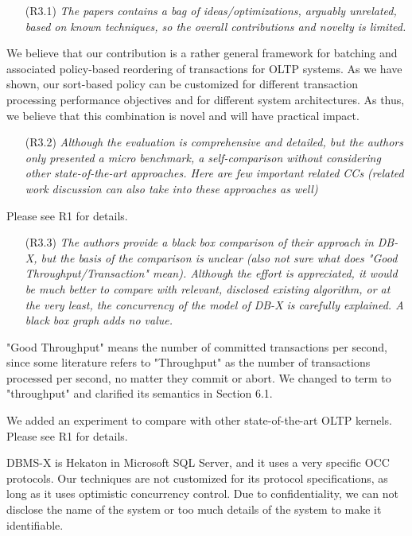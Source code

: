 \documentclass{article}
\newcommand{\todo}[1]{}
\newcommand{\changed}[1]{#1}
\newcommand{\todo}[1]{\textcolor{red}{\bf [TODO!: #1]}}
\newcommand{\changed}[1]{{\color{blue}#1}}
\begin{document}
\begin{itemize}
\item[(R3.1)] \emph{The papers contains a bag of ideas/optimizations, arguably unrelated,
	based on known techniques, so the overall contributions and novelty is
	limited.}
\end{itemize}

\todo{Better wording needed}
\changed{
	We believe that our contribution is a rather general framework for batching and associated policy-based reordering of transactions for OLTP systems. As we have shown, our sort-based policy can be customized for different transaction processing performance objectives and for different system architectures. As thus, we believe that this combination is novel and will have practical impact.
}

\begin{itemize}
\item[(R3.2)] \emph{Although the evaluation is comprehensive and detailed, but the authors
	only presented a micro benchmark, a self-comparison without considering
	other state-of-the-art approaches. Here are few important related CCs
	(related work discussion can also take into these approaches as well)}
\end{itemize}

\changed{
	Please see R1 for details.
}

\begin{itemize}
\item[(R3.3)] \emph{The authors provide a black box comparison of their approach in DB-X,
	but the basis of the comparison is unclear (also not sure what does
	"Good Throughput/Transaction" mean). Although the effort is appreciated,
	it would be much better to compare with relevant, disclosed existing
	algorithm, or at the very least, the concurrency of the model of DB-X is
	carefully explained. A black box graph adds no value.}
\end{itemize}

\changed{
	"Good Throughput" means the number of committed transactions per second, since some literature refers to "Throughput" as the number of transactions processed per second, no matter they commit or abort. We changed to term to "throughput" and clarified its semantics in Section 6.1.
	
	We added an experiment to compare with other state-of-the-art OLTP kernels. Please see R1 for details.
	
	DBMS-X is Hekaton in Microsoft SQL Server, and it uses a very specific OCC protocols. Our techniques are not customized for its protocol specifications, as long as it uses optimistic concurrency control. Due to confidentiality, we can not disclose the name of the system or too much details of the system to make it identifiable. 
}
\end{document}
